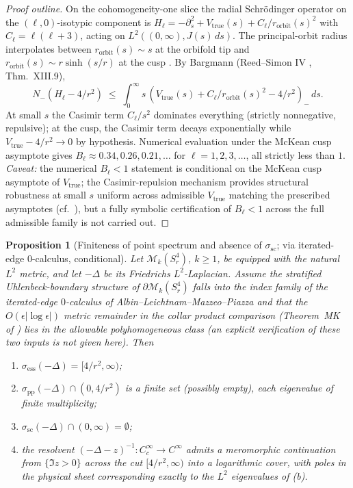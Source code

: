 \documentclass[11pt,letterpaper]{article}
\newtheorem{proposition}[theorem]{Proposition}
\theoremstyle{definition}
\newcommand{\cM}{\mathcal{M}}
\newcommand{\Lap}{\Delta}
\begin{document}
\begin{proof}[Proof outline]
On the cohomogeneity-one slice the radial Schr\"odinger operator on the $(\ell,0)$-isotypic component is $H_\ell = -\partial_s^2 + V_{\mathrm{true}}(s) + C_\ell/r_{\mathrm{orbit}}(s)^2$ with $C_\ell = \ell(\ell+3)$, acting on $L^2((0,\infty), J(s)\,ds)$. The principal-orbit radius interpolates between $r_{\mathrm{orbit}}(s) \sim s$ at the orbifold tip and $r_{\mathrm{orbit}}(s) \sim r\sinh(s/r)$ at the cusp \cite{m2-isotypic-decomposition}. By Bargmann (Reed--Simon IV \cite{ReedSimonIV}, Thm.~XIII.9),
\[
N_-(H_\ell - 4/r^2) \;\le\; \int_0^\infty s\,(V_{\mathrm{true}}(s) + C_\ell/r_{\mathrm{orbit}}(s)^2 - 4/r^2)_-\,ds.
\]
At small $s$ the Casimir term $C_\ell/s^2$ dominates everything (strictly nonnegative, repulsive); at the cusp, the Casimir term decays exponentially while $V_{\mathrm{true}} - 4/r^2 \to 0$ by hypothesis. Numerical evaluation \cite{m2-isotypic-decomposition} under the McKean cusp asymptote gives $B_\ell\approx 0.34, 0.26, 0.21,\ldots$ for $\ell = 1, 2, 3,\ldots$, all strictly less than $1$. \emph{Caveat:} the numerical $B_\ell < 1$ statement is conditional on the McKean cusp asymptote of $V_{\mathrm{true}}$; the Casimir-repulsion mechanism provides structural robustness at small $s$ uniform across admissible $V_{\mathrm{true}}$ matching the prescribed asymptotes (cf.\ \cite{m2-isotypic-decomposition}), but a fully symbolic certification of $B_\ell < 1$ across the full admissible family is not carried out.
\end{proof}

\begin{proposition}[Finiteness of point spectrum and absence of $\sigma_{\mathrm{sc}}$; via iterated-edge $0$-calculus, conditional]\label{prop:MM-finiteness}
Let $\cM_k(S^4_r)$, $k \ge 1$, be equipped with the natural $L^2$ metric, and let $-\Lap$ be its Friedrichs $L^2$-Laplacian. Assume the stratified Uhlenbeck-boundary structure of $\partial\cM_k(S^4_r)$ falls into the index family of the iterated-edge $0$-calculus of Albin--Leichtnam--Mazzeo--Piazza \cite{ALMP2012} and that the $O(\epsilon|\log\epsilon|)$ metric remainder in the collar product comparison (Theorem~MK of \cite{bonfioli-core}) lies in the allowable polyhomogeneous class (an explicit verification of these two inputs is not given here). Then
\begin{enumerate}
\item[(a)] $\sigma_{\mathrm{ess}}(-\Lap) = [4/r^2, \infty)$;
\item[(b)] $\sigma_{\mathrm{pp}}(-\Lap)\cap (0, 4/r^2)$ is a finite set (possibly empty), each eigenvalue of finite multiplicity;
\item[(c)] $\sigma_{\mathrm{sc}}(-\Lap)\cap(0, \infty) = \emptyset$;
\item[(d)] the resolvent $(-\Lap - z)^{-1}: C_c^\infty \to C^\infty$ admits a meromorphic continuation from $\{\Im z > 0\}$ across the cut $[4/r^2,\infty)$ into a logarithmic cover, with poles in the physical sheet corresponding exactly to the $L^2$ eigenvalues of (b).
\end{enumerate}
\end{proposition}
\end{document}
